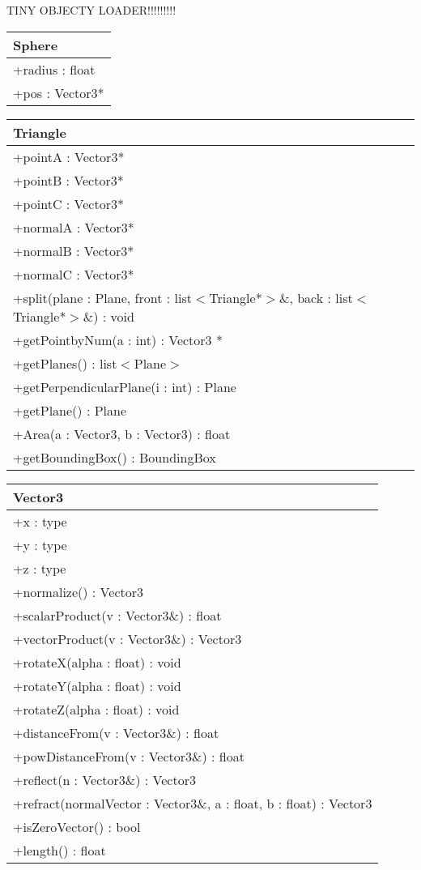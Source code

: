 TINY OBJECTY LOADER!!!!!!!!!

\begin{center}
    \begin{tabular}{|l|}
    \hline
    Sphere \\ \hline
    +radius : float \\
    +pos : Vector3* \\
    \hline
    \end{tabular}
\end{center}

\begin{center}
    \begin{tabular}{|l|}
    \hline
    Triangle \\ \hline
    +pointA : Vector3* \\
    +pointB : Vector3* \\
    +pointC : Vector3* \\
    +normalA : Vector3* \\
    +normalB : Vector3* \\
    +normalC : Vector3* \\
    \hline
	+split(plane : Plane, front : list$<$Triangle*$>$\&, back : list$<$Triangle*$>$\&) : void \\ 
	+getPointbyNum(a : int) : Vector3 * \\
	+getPlanes() : list$<$Plane$>$ \\
	+getPerpendicularPlane(i : int) : Plane \\
	+getPlane() : Plane \\
	+Area(a : Vector3, b : Vector3) : float \\
	+getBoundingBox() : BoundingBox \\
	\hline
    \end{tabular}
\end{center}


\begin{center}
    \begin{tabular}{|l|}
    \hline
    Vector3 \\ \hline
    +x : type \\
    +y : type \\
    +z : type \\
     \hline
	+normalize() : Vector3 \\ 
	+scalarProduct(v : Vector3\&) : float \\
	+vectorProduct(v : Vector3\&) : Vector3 \\
	+rotateX(alpha : float) : void \\
	+rotateY(alpha : float) : void \\
	+rotateZ(alpha : float) : void \\
	+distanceFrom(v : Vector3\&) : float \\
	+powDistanceFrom(v : Vector3\&) : float \\
	+reflect(n : Vector3\&) : Vector3 \\
	+refract(normalVector : Vector3\&, a : float, b : float) : Vector3 \\
	+isZeroVector() : bool \\
	+length() : float \\
	\hline
    \end{tabular}
\end{center}


